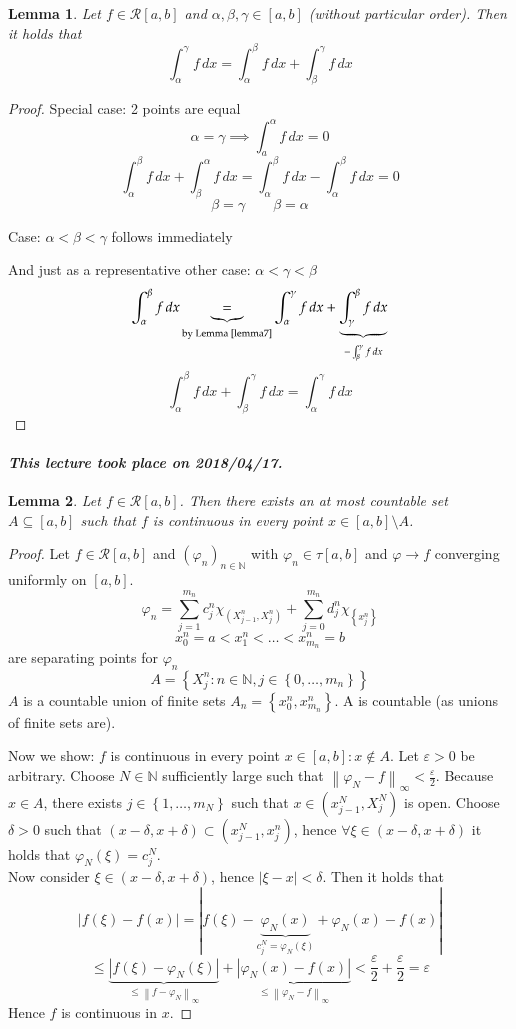 \documentclass{article}
\newtheorem{lemma}{Lemma}  \numberwithin{lemma}{section}
\newcommand{\set}[1]{\left\{#1\right\}}
\newcommand{\norm}[1]{\left\|#1\right\|}
\newcommand{\card}[1]{\left|#1\right|}
\newcommand{\dateref}[1]{\paragraph{\textit{This lecture took place on #1.}}}
\begin{document}
\begin{lemma} %
  \label{lemma8}
  Let $f \in \mathcal R[a,b]$ and $\alpha,\beta,\gamma \in [a,b]$ (without particular order).
  Then it holds that
  \[ \int_{\alpha}^\gamma f \, dx = \int_{\alpha}^\beta f \, dx + \int_{\beta}^\gamma f \, dx \]
\end{lemma}

\begin{proof}
  Special case: 2 points are equal
  \[ \alpha = \gamma \implies \int_a^\alpha f \, dx = 0 \]
  \[ \int_\alpha^\beta f \, dx + \int_\beta^\alpha f \, dx = \int_{\alpha}^\beta f \, dx - \int_\alpha^\beta f \, dx = 0 \]
  \[ \beta = \gamma \qquad \beta = \alpha \]

  Case: $\alpha < \beta < \gamma$ follows immediately

  And just as a representative other case: $\alpha < \gamma < \beta$
  \[ \int_{\alpha}^\beta f \, dx \underbrace{=}_{\text{by Lemma~\ref{lemma7}}} \int_{\alpha}^\gamma f \, dx + \underbrace{\int_{\gamma}^\beta f \, dx}_{- \int_{\beta}^\gamma f \, dx} \]
  \[ \int_\alpha^\beta f \, dx + \int_\beta^\gamma f \, dx = \int_\alpha^\gamma f \, dx \]
\end{proof}

\dateref{2018/04/17}

\begin{lemma} %
  \label{lemma9}
  Let $f \in \mathcal R[a,b]$. Then there exists an at most countable set $A \subseteq [a,b]$ such that $f$ is continuous in every point $x \in [a,b] \setminus A$.
\end{lemma}
\begin{proof}
  Let $f \in \mathcal R[a,b]$ and $(\varphi_n)_{n \in \mathbb N}$ with $\varphi_n \in \tau[a,b]$ and $\varphi \to f$ converging uniformly on $[a,b]$.
  \[ \varphi_n = \sum_{j=1}^{m_n} c_j^n \chi_{(X_{j-1}^n, X_j^n)} + \sum_{j=0}^{m_n} d_j^n \chi_{\set{x_j^n}} \]
  \[ x_0^n = a < x_1^n < \ldots < x_{m_n}^n = b \]
  are separating points for $\varphi_n$
  \[ A = \set{X_j^n: n \in \mathbb N, j \in \set{0, \ldots, m_n}} \]
  $A$ is a countable union of finite sets $A_n = \set{x_0^n, x_{m_n}^n}$. A is countable (as unions of finite sets are).

  Now we show: $f$ is continuous in every point $x \in [a,b]: x \not\in A$.
  Let $\varepsilon > 0$ be arbitrary. Choose $N \in \mathbb N$ sufficiently large such that $\norm{\varphi_N - f}_{\infty} < \frac\varepsilon2$. Because $x \in A$, there exists $j \in \set{1, \ldots, m_N}$ such that $x \in (x_{j-1}^N, X_j^N)$ is open.
  Choose $\delta > 0$ such that $(x - \delta, x + \delta) \subset (x_{j-1}^N, x_j^n)$, hence $\forall \xi \in (x - \delta, x + \delta)$ it holds that $\varphi_N(\xi) = c_j^N$. \\
  Now consider $\xi \in (x - \delta, x + \delta)$, hence $\card{\xi - x} < \delta$. Then it holds that
  \[ \card{f(\xi) - f(x)} = \card{f(\xi) - \underbrace{\varphi_N(x)}_{c_j^N = \varphi_N(\xi)} + \varphi_N(x) - f(x)} \]
  \[ \leq \underbrace{\card{f(\xi) - \varphi_N(\xi)}}_{\leq \norm{f - \varphi_N}_{\infty}} + \underbrace{\card{\varphi_N(x) - f(x)}}_{\leq \norm{\varphi_N - f}_{\infty}} < \frac\varepsilon2 + \frac\varepsilon2 = \varepsilon \]
  Hence $f$ is continuous in $x$.
\end{proof}
\end{document}
